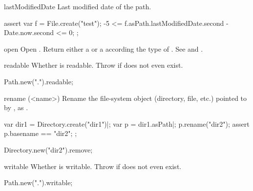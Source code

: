 \begin{urbiscriptapi}
\item[lastModifiedDate]%
  Last modified date of the path.
\begin{urbiscript}
assert
{
  var f = File.create("test");
  -5 <= f.asPath.lastModifiedDate.second - Date.now.second <= 0;
};
\end{urbiscript}


\item[open] Open \this. Return either a  or a 
  according the type of \this. See  and
  .


\item[readable]
  Whether \this is readable.  Throw if does not even exist.
\begin{urbiassert}
Path.new(".").readable;
\end{urbiassert}


\item[rename](<name>)%
  Rename the file-system object (directory, file, etc.) pointed to by \this,
  as .
\begin{urbiscript}
var dir1 = Directory.create("dir1")|;
var p = dir1.asPath|;
p.rename("dir2");
assert
{
  p.basename == "dir2";
};
\end{urbiscript}
\begin{urbicomment}
Directory.new("dir2").remove;
\end{urbicomment}


\item[writable]
  Whether \this is writable.  Throw if does not even exist.
\begin{urbiassert}
Path.new(".").writable;
\end{urbiassert}
\end{urbiscriptapi}


